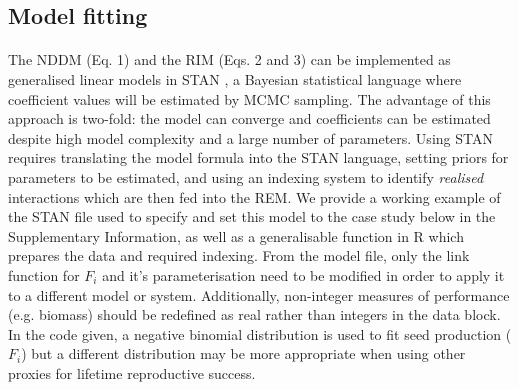 \documentclass[a4,12pt]{article}
\begin{document}


    \subsection{Model fitting}

        \paragraph{}        
        The NDDM (Eq. 1) and the RIM (Eqs. 2 and 3) can be implemented as generalised linear models in STAN \parencite{Carpenter2017}, a Bayesian statistical language where coefficient values will be estimated by MCMC sampling. The advantage of this approach is two-fold: the model can converge and coefficients can be estimated despite high model complexity and a large number of parameters. Using STAN requires translating the model formula into the STAN language, setting priors for parameters to be estimated, and using an indexing system to identify \textit{realised} interactions which are then fed into the REM. We provide a working example of the STAN file used to specify and set this model to the case study below in the Supplementary Information, as well as a generalisable function in R which prepares the data and required indexing. From the model file, only the link function for $F_i$ and it's parameterisation need to be modified in order to apply it to a different model or system. Additionally, non-integer measures of performance (e.g. biomass) should be redefined as real rather than integers in the data block. In the code given, a negative binomial distribution is used to fit seed production ($F_i$) but a different distribution may be more appropriate when using other proxies for lifetime reproductive success.   
\end{document}
